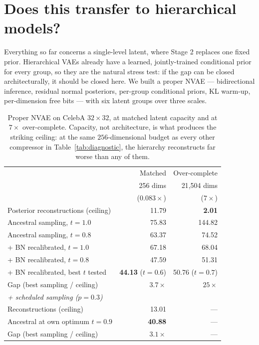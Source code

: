 \documentclass[sigconf,nonacm]{acmart}
\newcommand{\best}[1]{\textbf{#1}}
\begin{document}
\section{Does this transfer to hierarchical models?}
\label{sec:nvae}

Everything so far concerns a single-level latent, where Stage 2 replaces one
fixed prior. Hierarchical VAEs already have a learned, jointly-trained
conditional prior for every group, so they are the natural stress test: if the
gap can be closed architecturally, it should be closed here. We built a proper
NVAE --- bidirectional inference, residual normal posteriors, per-group
conditional priors, KL warm-up, per-dimension free bits --- with six latent
groups over three scales.

\begin{table}[t]
\caption{Proper NVAE on CelebA $32{\times}32$, at matched latent capacity and
at $7\times$ over-complete. Capacity, not architecture, is what produces the
striking ceiling: at the same $256$-dimensional budget as every other
compressor in Table~\ref{tab:diagnostic}, the hierarchy reconstructs far worse
than any of them.}
\label{tab:nvae}
\small
\begin{tabular}{lrr}
\toprule
 & Matched & Over-complete \\
 & 256 dims & 21{,}504 dims \\
 & ($0.083\times$) & ($7\times$) \\
\midrule
Posterior reconstructions (ceiling) & 11.79 & \best{2.01} \\
Ancestral sampling, $t{=}1.0$       & 75.83 & 144.82 \\
Ancestral sampling, $t{=}0.8$       & 63.37 & 74.52 \\
\;\;+ BN recalibrated, $t{=}1.0$    & 67.18 & 68.04 \\
\;\;+ BN recalibrated, $t{=}0.8$    & 47.59 & 51.31 \\
\;\;+ BN recalibrated, best $t$ tested & \best{44.13} ($t{=}0.6$) & 50.76 ($t{=}0.7$) \\
Gap (best sampling / ceiling)       & $3.7\times$ & $25\times$ \\
\midrule
\multicolumn{3}{l}{\emph{+ scheduled sampling ($p{=}0.3$)}}\\
\;\;Reconstructions (ceiling)               & 13.01 & --- \\
\;\;Ancestral at own optimum $t{=}0.9$      & \best{40.88} & --- \\
\;\;Gap (best sampling / ceiling)           & $3.1\times$ & --- \\
\bottomrule
\end{tabular}
\end{table}
\end{document}
